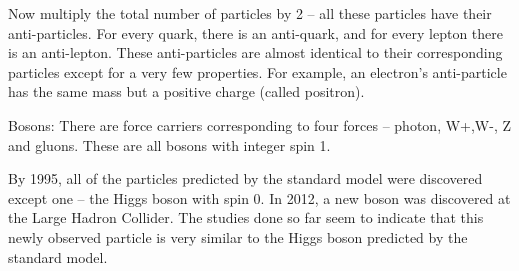Now multiply the total number of particles by 2 – all these particles have their anti-particles. For every quark, there is an anti-quark, and for every lepton there is an anti-lepton. These anti-particles are almost identical to their corresponding particles except for a very few properties.  For example, an electron’s anti-particle has the same mass but a positive charge (called positron).

Bosons: There are force carriers corresponding to four forces – photon, W+,W-,  Z and gluons.  These are all bosons with integer spin 1.

By 1995, all of the particles predicted by the standard model were discovered except one – the Higgs boson with spin 0. In 2012, a new boson was discovered at the Large Hadron Collider.  The studies done so far seem to indicate that this newly observed particle is very similar to the Higgs boson predicted by the standard model. 


